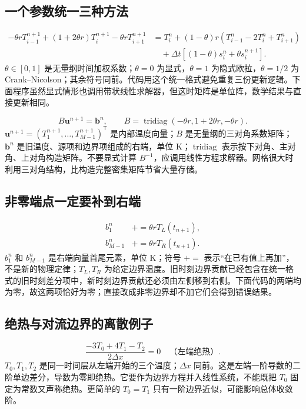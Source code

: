 \subsection{一个参数统一三种方法}
\begin{align}
-\theta rT_{i-1}^{n+1}+(1+2\theta r)T_i^{n+1}-\theta rT_{i+1}^{n+1}
&=T_i^n+(1-\theta)r(T_{i-1}^n-2T_i^n+T_{i+1}^n)\\
&\quad+\Delta t[(1-\theta)s_i^n+\theta s_i^{n+1}].
\end{align}
$\theta\in[0,1]$ 是无量纲时间加权系数；$\theta=0$ 为显式，$\theta=1$ 为隐式欧拉，$\theta=1/2$ 为 Crank--Nicolson；其余符号同前。代码用这个统一格式避免重复三份更新逻辑。下面程序虽然显式情形也调用带状线性求解器，但这时矩阵是单位阵，数学结果与直接更新相同。

\begin{equation}
B\boldsymbol u^{n+1}=\boldsymbol b^n,\qquad
B=\operatorname{tridiag}(-\theta r,1+2\theta r,-\theta r).
\end{equation}
$\boldsymbol u^{n+1}=(T_1^{n+1},\ldots,T_{M-1}^{n+1})^{\mathsf T}$ 是内部温度向量；$B$ 是无量纲的三对角系数矩阵；$\boldsymbol b^n$ 是旧温度、源项和边界项组成的右端，单位 K；$\operatorname{tridiag}$ 表示按下对角、主对角、上对角构造矩阵。不要显式计算 $B^{-1}$，应调用线性方程求解器。网格很大时利用三对角结构，比构造完整密集矩阵节省大量存储。

\subsection{非零端点一定要补到右端}
\begin{align}
b_1^n&\mathrel{+}=\theta rT_L(t_{n+1}),\\
b_{M-1}^n&\mathrel{+}=\theta rT_R(t_{n+1}).
\end{align}
$b_1^n$ 和 $b_{M-1}^n$ 是右端向量首尾元素，单位 K；符号 $\mathrel{+}=$ 表示“在已有值上再加”，不是新的物理定律；$T_L,T_R$ 为给定边界温度。旧时刻边界贡献已经包含在统一格式的旧时刻差分项中，新时刻边界贡献还必须由左侧移到右侧。下面代码的两端均为零，故这两项恰好为零；直接改成非零边界却不加它们会得到错误结果。

\subsection{绝热与对流边界的离散例子}
\begin{equation}
\frac{-3T_0+4T_1-T_2}{2\Delta x}=0\quad\text{（左端绝热）}.
\end{equation}
$T_0,T_1,T_2$ 是同一时间层从左端开始的三个温度；$\Delta x$ 同前。这是左端一阶导数的二阶单边差分，导数为零即绝热。它要作为边界方程并入线性系统，不能既把 $T_0$ 固定为常数又声称绝热。更简单的 $T_0=T_1$ 只有一阶边界近似，可能影响总体收敛阶。


